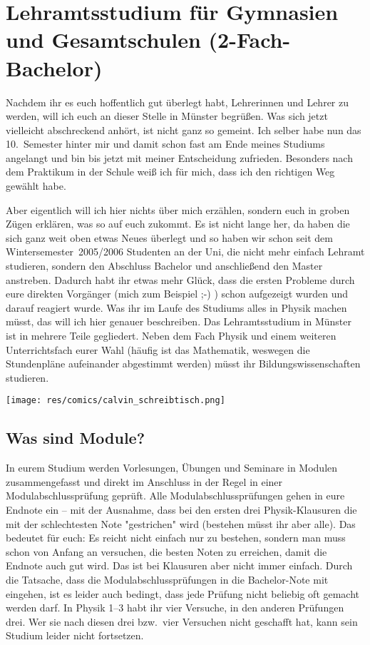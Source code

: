 
\section[Lehramtsstudium für Gymnasien \& Gesamtschulen (2-Fach-Bachelor)]{Lehramtsstudium für Gymnasien und Gesamtschulen (2-Fach-Bachelor)}
\begin{multicols*}{2}
Nachdem ihr es euch hoffentlich gut überlegt habt, Lehrerinnen und Lehrer zu werden, will ich euch an dieser Stelle in Münster begrüßen. Was sich jetzt vielleicht abschreckend anhört, ist nicht ganz so gemeint. Ich selber habe nun das 10.\ Semester hinter mir und damit schon fast am Ende meines Studiums angelangt und bin bis jetzt mit meiner Entscheidung zufrieden. Besonders nach dem Praktikum in der Schule weiß ich für mich, dass ich den richtigen Weg gewählt habe.

Aber eigentlich will ich hier nichts über mich erzählen, sondern euch in groben Zügen erklären, was so auf euch zukommt. Es ist nicht lange her, da haben die sich ganz weit oben etwas Neues überlegt und so haben wir schon seit dem Wintersemester~2005/2006 Studenten an der Uni, die nicht mehr einfach Lehramt studieren, sondern den Abschluss Bachelor und anschließend den Master anstreben. Dadurch habt ihr etwas mehr Glück, dass die ersten Probleme durch eure direkten Vorgänger (mich zum Beispiel ;-) ) schon aufgezeigt wurden und darauf reagiert wurde. Was ihr im Laufe des Studiums alles in Physik machen müsst, das will ich hier genauer beschreiben. Das Lehramtsstudium in Münster ist in mehrere Teile gegliedert. Neben dem Fach Physik und einem weiteren Unterrichtsfach eurer Wahl (häufig ist das Mathematik, weswegen die Stundenpläne aufeinander abgestimmt werden) müsst ihr Bildungswissenschaften studieren.

\begin{center}
\texttt{[image: res/comics/calvin\_schreibtisch.png]}
\end{center}

\subsection*{Was sind Module?}
In eurem Studium werden Vorlesungen, Übungen und Seminare in Modulen zusammengefasst und direkt im Anschluss in der Regel in einer Modulabschlussprüfung geprüft. Alle Modulabschlussprüfungen gehen in eure Endnote ein -- mit der Ausnahme, dass bei den ersten drei Physik-Klausuren die mit der schlechtesten Note "gestrichen" wird (bestehen müsst ihr aber alle). Das bedeutet für euch: Es reicht nicht einfach nur zu bestehen, sondern man muss schon von Anfang an versuchen, die besten Noten zu erreichen, damit die Endnote auch gut wird. Das ist bei Klausuren aber nicht immer einfach. Durch die Tatsache, dass die Modulabschlussprüfungen in die Bachelor-Note mit eingehen, ist es leider auch bedingt, dass jede Prüfung nicht beliebig oft gemacht werden darf. In Physik 1--3 habt ihr vier Versuche, in den anderen Prüfungen drei. Wer sie nach diesen drei bzw.\ vier Versuchen nicht geschafft hat, kann sein Studium leider nicht fortsetzen.


\end{multicols*}
